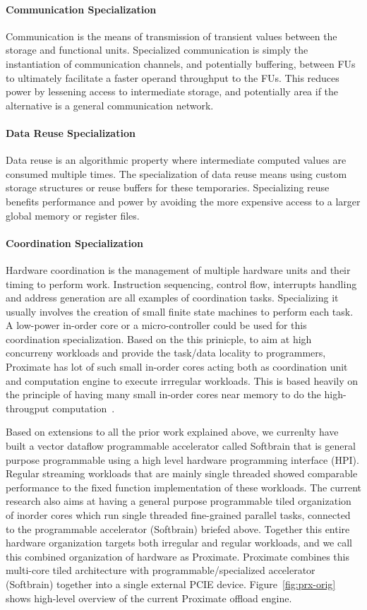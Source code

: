 \paragraph{Communication Specialization} Communication is the means of transmission of transient values between
the storage and functional units. Specialized communication is simply the instantiation of communication
channels, and potentially buffering, between FUs to ultimately facilitate a faster operand throughput to the
FUs. This reduces power by lessening access to intermediate storage, and potentially area if the alternative is
a general communication network.

\paragraph{Data Reuse Specialization} Data reuse is an algorithmic property where intermediate computed values
are consumed multiple times. The specialization of data reuse means using custom storage structures or
reuse buffers for these temporaries. Specializing reuse benefits performance and power by avoiding the more
expensive access to a larger global memory or register files.

\paragraph{Coordination Specialization} Hardware coordination is the management of multiple hardware units and
their timing to perform work. Instruction sequencing, control flow, interrupts handling and address generation
are all examples of coordination tasks. Specializing it usually involves the creation of small finite state
machines to perform each task. A low-power in-order core or a micro-controller could be used for this
coordination specialization. Based on the this prinicple, to aim at high concurreny workloads and provide 
the task/data locality to 
programmers, Proximate has lot of  such small in-order cores acting both 
as coordination unit and computation engine to execute irrregular workloads. This is based heavily on the 
principle of having many small in-order cores near memory to do the high-througput computation~\cite{menon2014memory}.

Based on extensions to all the prior work explained above,
we currenlty have built a vector dataflow programmable accelerator 
called Softbrain that is general purpose  
programmable using a high level hardware 
programming interface (HPI). 
Regular streaming workloads that are mainly 
single threaded showed comparable performance to the 
fixed function implementation of these workloads. 
The current research also aims at having a general purpose 
programmable tiled organization of 
inorder cores which run single threaded fine-grained parallel tasks,
connected to the programmable accelerator (Softbrain) briefed above. 
Together this entire hardware organization targets both 
irregular and regular workloads, and we call 
this combined organization of hardware as Proximate. 
Proximate combines this multi-core tiled architecture with
programmable/specialized accelerator (Softbrain) together into a 
single external PCIE device. Figure~\ref{fig:prx-orig} shows high-level
overview of the current Proximate offload engine. 

